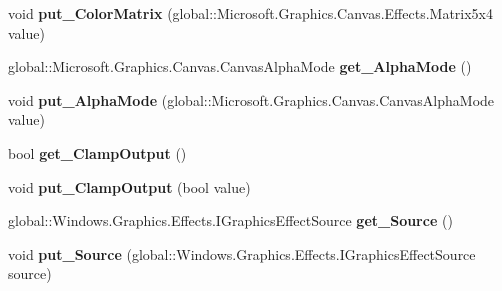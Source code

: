 \begin{DoxyCompactItemize}
void {\bfseries put\+\_\+\+Color\+Matrix} (global\+::\+Microsoft.\+Graphics.\+Canvas.\+Effects.\+Matrix5x4 value)
\item 
\mbox{\label{class_microsoft_1_1_graphics_1_1_canvas_1_1_effects_1_1_color_matrix_effect_abfdb6c68cffed7e33d14c5dac4b1ea80}} 
global\+::\+Microsoft.\+Graphics.\+Canvas.\+Canvas\+Alpha\+Mode {\bfseries get\+\_\+\+Alpha\+Mode} ()
\item 
\mbox{\label{class_microsoft_1_1_graphics_1_1_canvas_1_1_effects_1_1_color_matrix_effect_aecefb800adc320dde05a7b4b9ec65fe0}} 
void {\bfseries put\+\_\+\+Alpha\+Mode} (global\+::\+Microsoft.\+Graphics.\+Canvas.\+Canvas\+Alpha\+Mode value)
\item 
\mbox{\label{class_microsoft_1_1_graphics_1_1_canvas_1_1_effects_1_1_color_matrix_effect_a8f24f3336c23b20f9db23f8a09141338}} 
bool {\bfseries get\+\_\+\+Clamp\+Output} ()
\item 
\mbox{\label{class_microsoft_1_1_graphics_1_1_canvas_1_1_effects_1_1_color_matrix_effect_aef6085c7c12fe7233bd318ecd406ce13}} 
void {\bfseries put\+\_\+\+Clamp\+Output} (bool value)
\item 
\mbox{\label{class_microsoft_1_1_graphics_1_1_canvas_1_1_effects_1_1_color_matrix_effect_a53395ee86eb2e91948c5e28aa877e46a}} 
global\+::\+Windows.\+Graphics.\+Effects.\+I\+Graphics\+Effect\+Source {\bfseries get\+\_\+\+Source} ()
\item 
\mbox{\label{class_microsoft_1_1_graphics_1_1_canvas_1_1_effects_1_1_color_matrix_effect_a5c460636172b94a6c671e8882c4e86a9}} 
void {\bfseries put\+\_\+\+Source} (global\+::\+Windows.\+Graphics.\+Effects.\+I\+Graphics\+Effect\+Source source)
\item 
\mbox{\label{class_microsoft_1_1_graphics_1_1_canvas_1_1_effects_1_1_color_matrix_effect_a6f8ec6fe9afbcf59d1aa58feae0b52fa}} 

\end{DoxyCompactItemize}
